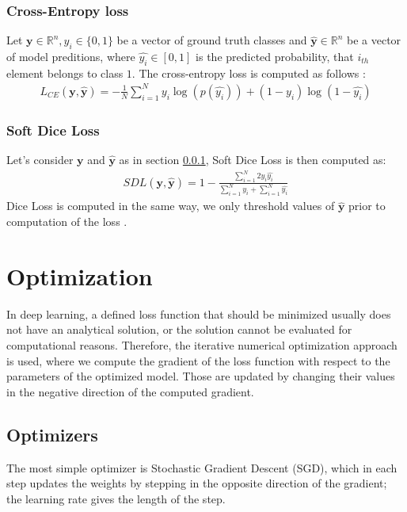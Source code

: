 \subsubsection{Cross-Entropy loss}
\label{sec:cross_entropy}
Let $\mathbf{y} \in \mathbb{R}^n, y_i \in \{ 0, 1 \}$ be a vector of ground truth classes and $\hat{\mathbf{y}} \in \mathbb{R}^n$ be a vector of model preditions, where $\hat{y_i} \in [0, 1]$ is the predicted probability, that $i_{th}$ element belongs to class $1$. The cross-entropy loss is computed as follows \cite{Jadon2020}:
\begin{align}
    L_{CE}(\mathbf{y}, \hat{\mathbf{y}}) = - \frac{1}{N} \sum_{i=1}^N y_i \log (p(\hat{y_i})) + (1 - y_i) \log (1 - \hat{y_i})
\end{align}

\subsubsection{Soft Dice Loss}
Let's consider $\mathbf{y}$ and $\hat{\mathbf{y}}$ as in section \ref{sec:cross_entropy}, Soft Dice Loss is then computed as:
\begin{align}
    SDL(\mathbf{y}, \hat{\mathbf{y}}) = 1 - \frac{\sum_{i=1}^N 2y_i \hat{y_i}}{\sum_{i=1}^N y_i + \sum_{i=1}^N \hat{y_i}}
\end{align}
Dice Loss is computed in the same way, we only threshold values of $\hat{\mathbf{y}}$ prior to computation of the loss \cite{Softdiceloss,Jadon2020}.

\section{Optimization}
In deep learning, a defined loss function that should be minimized usually does not have an analytical solution, or the solution cannot be evaluated for computational reasons. Therefore, the iterative numerical optimization approach is used, where we compute the gradient of the loss function with respect to the parameters of the optimized model. Those are updated by changing their values in the negative direction of the computed gradient.
\subsection{Optimizers}
The most simple optimizer is Stochastic Gradient Descent (SGD), which in each step updates the weights by stepping in the opposite direction of the gradient; the learning rate gives the length of the step.

